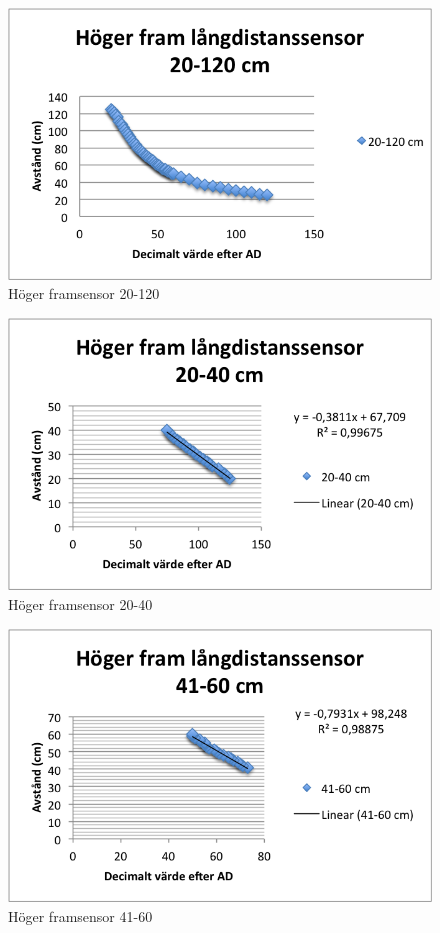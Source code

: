 \begin{figure}[H]
  \centering
 \includegraphics[angle=0,scale=1]{bilder/HF_20_120.png}
  \caption{Höger framsensor 20-120}
\end{figure}

\begin{figure}[H]
  \centering
 \includegraphics[angle=0,scale=1]{bilder/HF_20_40.png}
  \caption{Höger framsensor 20-40}
\end{figure}

\begin{figure}[H]
  \centering
 \includegraphics[angle=0,scale=1]{bilder/HF_41_60.png}
  \caption{Höger framsensor 41-60}
\end{figure}

